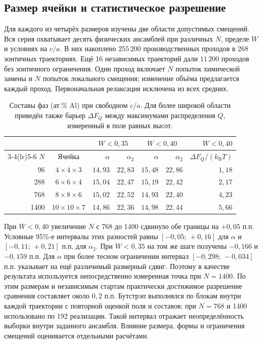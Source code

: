 \documentclass[11pt,a4paper]{article}
\begin{document}
\subsection{Размер ячейки и статистическое разрешение}

Для каждого из четырёх размеров изучены две области допустимых
смещений. Вся серия охватывает десять физических ансамблей при
различных $N$, пределе $W$ и условиях на $c/a$. В них накоплено
$255\,200$ производственных проходов в 268 зонтичных траекториях.
Ещё 16 независимых траекторий дали $11\,200$ проходов без зонтичного
ограничения. Один проход включает $N$ попыток химической замены
и $N$ попыток локального смещения; изменение объёма предлагается
каждый проход. Первоначальная релаксация исключена из всех средних.

\begin{table}[htbp]
\centering\small
\caption{Составы фаз (ат.\% Al) при свободном $c/a$. Для более
широкой области приведён также барьер $\Delta F_Q$ между максимумами
распределения $Q$, измеренный в поле равных высот.}
\label{tab:bulk-size}
\begin{tabular}{@{}r c rr rr r@{}}
\toprule
 & & \multicolumn{2}{c}{$W<0{,}35$} & \multicolumn{2}{c}{$W<0{,}40$}
 & $W<0{,}40$\\
\cmidrule(lr){3-4}\cmidrule(lr){5-6}
$N$ & Ячейка & $\alpha$ & $\alpha_2$ & $\alpha$ & $\alpha_2$
 & $\Delta F_Q/(k_{\mathrm B}T)$\\
\midrule
  96 & $4\times4\times3$   & $14{,}93$ & $22{,}83$ & $15{,}48$ & $22{,}86$ & $1{,}18$\\
 288 & $6\times6\times4$   & $15{,}04$ & $22{,}47$ & $15{,}19$ & $22{,}42$ & $2{,}17$\\
 768 & $8\times8\times6$   & $15{,}02$ & $22{,}52$ & $14{,}93$ & $22{,}40$ & $4{,}23$\\
1400 & $10\times10\times7$ & $14{,}86$ & $22{,}36$ & $14{,}98$ & $22{,}44$ & $5{,}66$\\
\bottomrule
\end{tabular}
\end{table}

При $W<0{,}40$ увеличение $N$ с 768 до 1400 сдвинуло обе границы
на $+0{,}05$ п.п. Условные 95\%-е интервалы этих разностей равны
$[-0{,}05;\,+0{,}16]$ для $\alpha$ и $[-0{,}11;\,+0{,}21]$ п.п.
для $\alpha_2$. При $W<0{,}35$ на том же шаге получены
$-0{,}166$ и $-0{,}159$ п.п. Для $\alpha$ при более тесном
ограничении интервал $[-0{,}298;\,-0{,}034]$ п.п. указывает на
ещё различимый размерный сдвиг. Поэтому в качестве результата
используется непосредственно измеренная точка при $N=1400$.
По этим размерам и независимым стартам практически достижимое
разрешение сравнения составляет около $0{,}2$ п.п. Бутстрэп
выполнялся по блокам внутри каждой траектории с повторной оценкой
поля и составов; при $N=768$ и 1400 использовано по 192 реализации.
Такой интервал отражает неопределённость выборки внутри заданного
ансамбля. Влияние размера, формы и ограничения смещений оценивается
отдельными расчётами.
\end{document}
